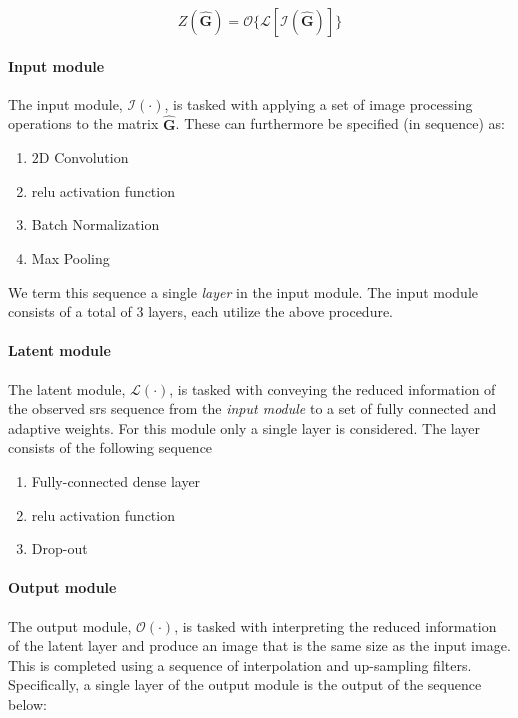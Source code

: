 \begin{equation}
    Z(\mathbf{\hat{G}}) = \mathcal{O}\{\mathcal{L}[\mathcal{I}(\mathbf{\hat{G}})]\}
\end{equation}

\paragraph{Input module}
The input module, $\mathcal{I}(\cdot)$, is tasked with applying a set of image processing operations to the matrix $\mathbf{\hat{G}}$. These can furthermore be specified (in sequence) as:

\begin{enumerate}
    \item $2$D Convolution
    \item \gls{relu} activation function
    \item Batch Normalization
    \item Max Pooling
\end{enumerate}

We term this sequence a single \emph{layer} in the input module. The input module consists of a total of $3$ layers, each utilize the above procedure.

\paragraph{Latent module}
The latent module, $\mathcal{L}(\cdot)$, is tasked with conveying the reduced information of the observed \gls{srs} sequence from the \textit{input module} to a set of fully connected and adaptive weights. For this module only a single layer is considered. The layer consists of the following sequence
\begin{enumerate}
    \item Fully-connected dense layer
    \item \gls{relu} activation function
    \item Drop-out
\end{enumerate}

\paragraph{Output module}
The output module, $\mathcal{O}(\cdot)$, is tasked with interpreting the reduced information of the latent layer and produce an image that is the same size as the input image. This is completed using a sequence of interpolation and up-sampling filters. Specifically, a single layer of the output module is the output of the sequence below:

